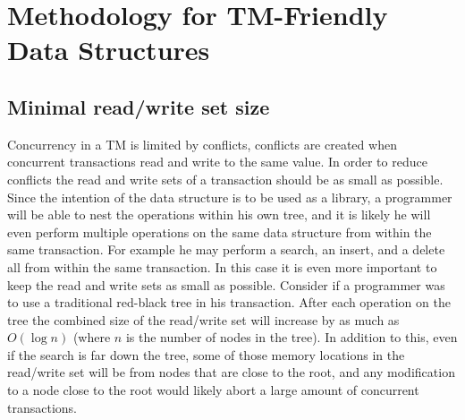 \documentclass[10pt]{sigplanconf}
\begin{document}
\section{Methodology for TM-Friendly Data Structures}

\subsection{Minimal read/write set size}
Concurrency in a TM is limited by conflicts, conflicts are created when concurrent transactions read and write to the same value.
In order to reduce conflicts the read and write sets of a transaction should be as small as possible.
Since the intention of the data structure is to be used as a library, a programmer will be able to nest the operations within his own tree, and it is likely he will even perform multiple operations on the same data structure from within the same transaction.
For example he may perform a search, an insert, and a delete all from within the same transaction.
In this case it is even more important to keep the read and write sets as small as possible.
Consider if a programmer was to use a traditional red-black tree in his transaction.
After each operation on the tree the combined size of the read/write set will increase by as much as $O(\log{n})$ (where $n$ is the number of nodes in the tree).
In addition to this, even if the search is far down the tree, some of those memory locations in the read/write set will be from nodes that are close to the root, and any modification to a node close to the root would likely
abort a large amount of concurrent transactions.
\end{document}
